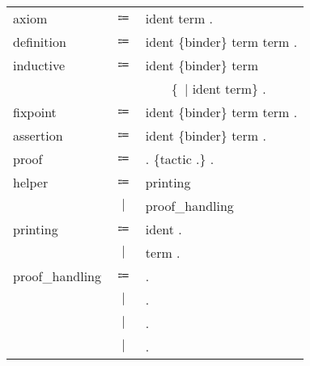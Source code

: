 \begin{table}[!htb]
\begin{tabular}{lcl}
        axiom
            &$\Coloneqq$&\fAxiom{} ident \scolon{} term .\\
        definition
            &$\Coloneqq$&\fDefinition{} ident \{binder\} \scolon{} term \scoloneq{} term .\\
        inductive
            &$\Coloneqq$&\fInductive{} ident \{binder\} \scolon{} term \scoloneq{}\\
            &&~~~~\{~$\mid$ ident \scolon{} term\} .\\
        fixpoint
            &$\Coloneqq$&\fFixpoint{} ident \{binder\} \scolon{} term \scoloneq{} term .\\
        assertion
            &$\Coloneqq$&\fTheorem{} ident \{binder\} \scolon{} term .\\
        proof
            &$\Coloneqq$&\fProof{} . \{tactic .\} \fQed{} .\\
        helper
            &$\Coloneqq$&printing\\
            &$\mid$&proof\_handling\\
        printing
            &$\Coloneqq$&\fPrint{} ident .\\
            &$\mid$&\fCheck{} term .\\
        proof\_handling
            &$\Coloneqq$&\fUndo{} .\\
            &$\mid$&\fRestart{} .\\
            &$\mid$&\fAdmitted{} .\\
            &$\mid$&\fAbort{} .\\
    \end{tabular}
\end{table}
\newpage
